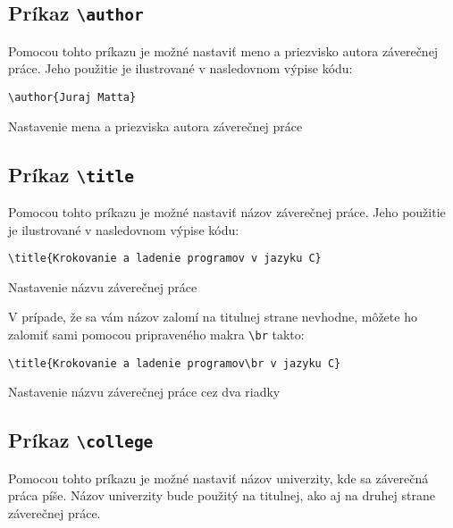 \subsection{Príkaz {\tt \textbackslash{}author}}

Pomocou tohto príkazu je možné nastaviť meno a priezvisko autora záverečnej práce. Jeho použitie je ilustrované v nasledovnom výpise kódu:

\begin{listing}[ht]
\begin{verbatim}
\author{Juraj Matta}
\end{verbatim}
\caption{Nastavenie mena a priezviska autora záverečnej práce}
\end{listing}


\subsection{Príkaz {\tt \textbackslash{}title}}

Pomocou tohto príkazu je možné nastaviť názov záverečnej práce. Jeho použitie je ilustrované v nasledovnom výpise kódu:

\begin{listing}[ht]
\begin{verbatim}
\title{Krokovanie a ladenie programov v jazyku C}
\end{verbatim}
\caption{Nastavenie názvu záverečnej práce}
\end{listing}

V prípade, že sa vám názov zalomí na titulnej strane nevhodne, môžete ho zalomiť sami pomocou pripraveného makra {\tt \textbackslash{}br} takto:

\begin{listing}[ht]
\begin{verbatim}
\title{Krokovanie a ladenie programov\br v jazyku C}
\end{verbatim}
\caption{Nastavenie názvu záverečnej práce cez dva riadky}
\end{listing}


\subsection{Príkaz {\tt \textbackslash{}college}}

Pomocou tohto príkazu je možné nastaviť názov univerzity, kde sa záverečná práca píše. Názov univerzity bude použitý na titulnej, ako aj na druhej strane záverečnej práce.

